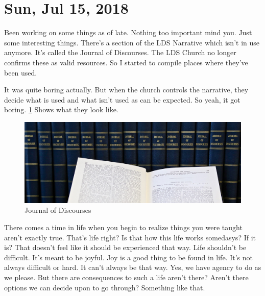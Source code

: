 \section{Sun, Jul 15, 2018}

Been working on some things as of late. Nothing too
important mind you. Just some interesting things. There's
a section of the LDS Narrative which isn't in use anymore.
It's called the Journal of Discourses. The LDS Church no
longer confirms these as valid resources. So I started to
compile places where they've been used.

It was quite boring actually. But when the church controls
the narrative, they decide what is used and what isn't used as
can be expected. So yeah, it got boring. \ref{fig:jod} Shows
what they look like.

\begin{figure}[h!]
  \centering
  \includegraphics[width=1.0\linewidth]{2018/images/jod.jpg}
  \caption{Journal of Discourses}
  \label{fig:jod}
\end{figure}

There comes a time in life when you begin to realize things you 
were taught aren't exactly true. That's life right? Is that how
this life works somedasys? If it is? That doesn't feel like it
should be experienced that way. Life shouldn't be difficult. It's
meant to be joyful. Joy is a good thing to be found in life. It's
not always difficult or hard. It can't always be that way. Yes,
we have agency to do as we please. But there are consequences to
such a life aren't there? Aren't there options we can decide upon
to go through? Something like that.